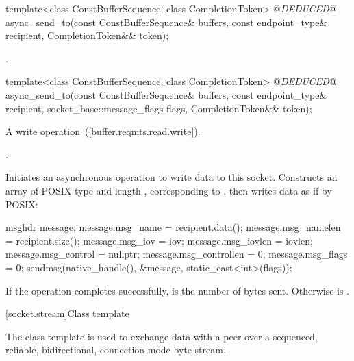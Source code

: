 \begin{itemdecl}
template<class ConstBufferSequence, class CompletionToken>
  @\textit{DEDUCED}@ async_send_to(const ConstBufferSequence& buffers,
                        const endpoint_type& recipient,
                        CompletionToken&& token);
\end{itemdecl}

\begin{itemdescr}
\pnum
\returns {}.
\end{itemdescr}

\begin{itemdecl}
template<class ConstBufferSequence, class CompletionToken>
  @\textit{DEDUCED}@ async_send_to(const ConstBufferSequence& buffers,
                        const endpoint_type& recipient,
                        socket_base::message_flags flags,
                        CompletionToken&& token);
\end{itemdecl}

\begin{itemdescr}
\pnum
A write operation~(\ref{buffer.reqmts.read.write}).

\pnum
\completionsig {}.

\pnum
\effects Initiates an asynchronous operation to write data to this socket. Constructs an array  of POSIX type  and length , corresponding to , then writes data as if by POSIX: 
\begin{codeblock}
msghdr message;
message.msg_name = recipient.data();
message.msg_namelen = recipient.size();
message.msg_iov = iov;
message.msg_iovlen = iovlen;
message.msg_control = nullptr;
message.msg_controllen = 0;
message.msg_flags = 0;
sendmsg(native_handle(), &message, static_cast<int>(flags));
\end{codeblock}


\pnum
If the operation completes successfully,  is the number of bytes sent. Otherwise  is .
\end{itemdescr}




[socket.stream]{Class template }

\pnum
The class template  is used to exchange data with a peer over a sequenced, reliable, bidirectional, connection-mode byte stream.

